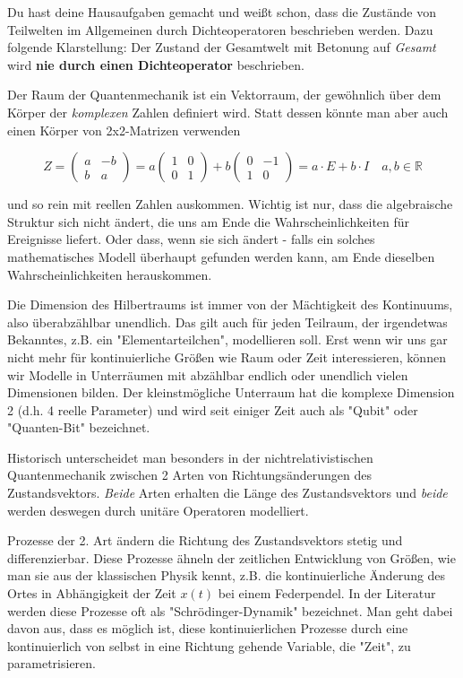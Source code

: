 \documentclass[12pt]{book}
\begin{document}
Du hast deine Hausaufgaben gemacht und weißt schon, dass die Zustände von Teilwelten im Allgemeinen durch Dichteoperatoren beschrieben werden. Dazu folgende Klarstellung: Der Zustand der Gesamtwelt mit Betonung auf \emph{Gesamt} wird \textbf{nie durch einen Dichteoperator} beschrieben. 

Der Raum der Quantenmechanik ist ein Vektorraum, der gewöhnlich über dem Körper der \emph{komplexen} Zahlen definiert wird. Statt dessen könnte man aber auch einen Körper von 2x2-Matrizen verwenden

\begin{equation*}
Z = \begin{pmatrix}a&-b\\b&a\end{pmatrix} = a \begin{pmatrix}1&0\\0&1\end{pmatrix} + b \begin{pmatrix}0&-1\\1&0\end{pmatrix} = a \cdot E + b \cdot I \quad a,b \in \mathbb{R}
\end{equation*} 

und so rein mit reellen Zahlen auskommen. Wichtig ist nur, dass die algebraische Struktur sich nicht ändert, die uns am Ende die Wahrscheinlichkeiten für Ereignisse liefert. Oder dass, wenn sie sich ändert - falls ein solches mathematisches Modell überhaupt gefunden werden kann, am Ende dieselben Wahrscheinlichkeiten herauskommen. 

Die Dimension des Hilbertraums ist immer von der Mächtigkeit des Kontinuums, also überabzählbar unendlich. Das gilt auch für jeden Teilraum, der irgendetwas Bekanntes, z.B. ein "Elementarteilchen", modellieren soll. Erst wenn wir uns gar nicht mehr für  kontinuierliche Größen wie Raum oder Zeit interessieren, können wir Modelle in Unterräumen mit abzählbar endlich oder unendlich vielen Dimensionen bilden. Der kleinstmögliche Unterraum hat die komplexe Dimension 2 (d.h. 4 reelle Parameter) und wird seit einiger Zeit auch als "Qubit" oder "Quanten-Bit" bezeichnet. 

Historisch unterscheidet man besonders in der nichtrelativistischen Quantenmechanik zwischen 2 Arten von Richtungsänderungen des Zustandsvektors. \emph{Beide} Arten erhalten die Länge des Zustandsvektors und \emph{beide} werden deswegen durch unitäre Operatoren modelliert.

Prozesse der 2. Art ändern die Richtung des Zustandsvektors stetig und differenzierbar. Diese Prozesse ähneln der zeitlichen Entwicklung von Größen, wie man sie aus der klassischen Physik kennt, z.B. die kontinuierliche Änderung des Ortes in Abhängigkeit der Zeit $x(t)$ bei einem Federpendel. In der Literatur werden diese Prozesse oft als "Schrödinger-Dynamik" bezeichnet. Man geht dabei davon aus, dass es möglich ist, diese kontinuierlichen Prozesse durch eine kontinuierlich von selbst in eine Richtung gehende Variable, die "Zeit", zu parametrisieren. 
\end{document}
